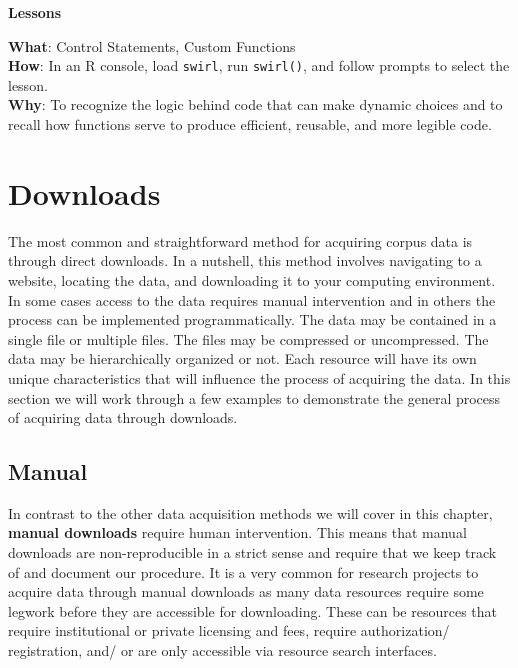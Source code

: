 \documentclass[
  letterpaper,
]{latex/krantz}
\theoremstyle{definition}
\theoremstyle{remark}
\begin{document}
\begin{tcolorbox}[enhanced jigsaw, breakable, leftrule=.75mm, arc=.35mm, colframe=quarto-callout-color-frame, colback=white, left=2mm, bottomrule=.15mm, rightrule=.15mm, toprule=.15mm, opacityback=0]

\textbf{ Lessons}

\textbf{What}: Control Statements, Custom Functions\\
\textbf{How}: In an R console, load \texttt{swirl}, run
\texttt{swirl()}, and follow prompts to select the lesson.\\
\textbf{Why}: To recognize the logic behind code that can make dynamic
choices and to recall how functions serve to produce efficient,
reusable, and more legible code.

\end{tcolorbox}

\section{Downloads}\label{downloads}

The most common and straightforward method for acquiring corpus data is
through direct downloads. In a nutshell, this method involves navigating
to a website, locating the data, and downloading it to your computing
environment. In some cases access to the data requires manual
intervention and in others the process can be implemented
programmatically. The data may be contained in a single file or multiple
files. The files may be compressed or uncompressed. The data may be
hierarchically organized or not. Each resource will have its own unique
characteristics that will influence the process of acquiring the data.
In this section we will work through a few examples to demonstrate the
general process of acquiring data through downloads.

\subsection{Manual}\label{manual}

In contrast to the other data acquisition methods we will cover in this
chapter, \textbf{manual downloads} require human intervention. This
means that manual downloads are non-reproducible in a strict sense and
require that we keep track of and document our procedure. It is a very
common for research projects to acquire data through manual downloads as
many data resources require some legwork before they are accessible for
downloading. These can be resources that require institutional or
private licensing and fees, require authorization/ registration, and/ or
are only accessible via resource search interfaces.
\end{document}
